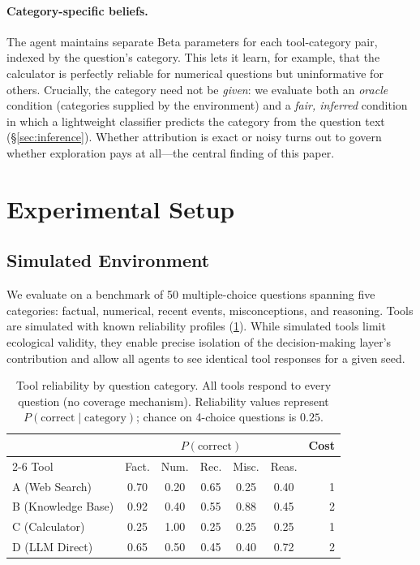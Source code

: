 \documentclass[11pt]{article}
\begin{document}
\paragraph{Category-specific beliefs.}
The agent maintains separate Beta parameters for each tool-category pair, indexed by the question's category. This lets it learn, for example, that the calculator is perfectly reliable for numerical questions but uninformative for others. Crucially, the category need not be \emph{given}: we evaluate both an \emph{oracle} condition (categories supplied by the environment) and a \emph{fair, inferred} condition in which a lightweight classifier predicts the category from the question text (\S\ref{sec:inference}). Whether attribution is exact or noisy turns out to govern whether exploration pays at all---the central finding of this paper.


\section{Experimental Setup}
\label{sec:setup}

\subsection{Simulated Environment}

We evaluate on a benchmark of 50 multiple-choice questions spanning five categories: factual, numerical, recent events, misconceptions, and reasoning. Tools are simulated with known reliability profiles (\cref{tab:tools}). While simulated tools limit ecological validity, they enable precise isolation of the decision-making layer's contribution and allow all agents to see identical tool responses for a given seed.

\begin{table}[t]
\centering
\caption{Tool reliability by question category. All tools respond to every question (no coverage mechanism). Reliability values represent $P(\text{correct} \mid \text{category})$; chance on 4-choice questions is $0.25$.}
\label{tab:tools}
\small
\begin{tabular}{@{}lcccccr@{}}
\toprule
& \multicolumn{5}{c}{$P(\text{correct})$} & Cost \\
\cmidrule(lr){2-6}
Tool & Fact. & Num. & Rec. & Misc. & Reas. & \\
\midrule
A (Web Search)      & 0.70 & 0.20 & 0.65 & 0.25 & 0.40 & 1 \\
B (Knowledge Base)  & 0.92 & 0.40 & 0.55 & 0.88 & 0.45 & 2 \\
C (Calculator)      & 0.25 & 1.00 & 0.25 & 0.25 & 0.25 & 1 \\
D (LLM Direct)      & 0.65 & 0.50 & 0.45 & 0.40 & 0.72 & 2 \\
\bottomrule
\end{tabular}
\end{table}
\end{document}
